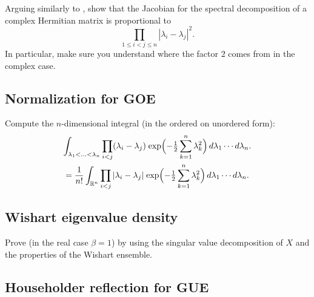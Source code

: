 \documentclass[letterpaper,11pt,oneside,reqno]{article}
\numberwithin{equation}{section}
\newcommand{\ssp}{\hspace{1pt}}
\theoremstyle{definition}
\begin{document}
Arguing similarly to
,
show that the Jacobian for the spectral decomposition
of a complex Hermitian matrix is proportional to
\begin{equation*}
	\prod_{1\le i<j\le n}|\lambda_i-\lambda_j|^2.
\end{equation*}
In particular, make sure you understand
where the factor $2$ comes from in the complex case.

\subsection{Normalization for GOE}
\label{prob:GOE-normalization}

Compute the $n$-dimensional integral
(in the ordered on unordered form):
\begin{multline*}
	\int_{\lambda_1<\ldots<\lambda_n } \prod_{i<j}(\lambda_i-\lambda_j)
	\ssp
	\exp\Bigl(-\tfrac{1}{2}\sum_{k=1}^n \lambda_k^2\Bigr)\,d\lambda_1\cdots d\lambda_n.\\=
	\frac{1}{n!}
	\int_{\mathbb{R}^n}
	\prod_{i<j}|\lambda_i-\lambda_j|\ssp
	\exp\Bigl(-\tfrac{1}{2}\sum_{k=1}^n \lambda_k^2\Bigr)\,d\lambda_1\cdots d\lambda_n.
\end{multline*}



\subsection{Wishart eigenvalue density}

Prove  (in the real case $\beta=1$)
by using the singular
value
decomposition
of \(X\) and the properties of the Wishart ensemble.

\subsection{Householder reflection for GUE}
\end{document}
